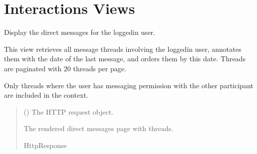 \documentclass[letterpaper,10pt,english]{sphinxmanual}
\begin{document}
\section{Interactions Views}
\label{\detokenize{modules/views:module-interactions.views}}\label{\detokenize{modules/views:interactions-views}}

\begin{fulllineitems}
\label{\detokenize{modules/views:interactions.views.direct_messages}}
\pysigstartsignatures
{}
\pysigstopsignatures
\sphinxAtStartPar
Display the direct messages for the logged\sphinxhyphen{}in user.

\sphinxAtStartPar
This view retrieves all message threads involving the logged\sphinxhyphen{}in user,
annotates them with the date of the last message, and orders them by
this date. Threads are paginated with 20 threads per page.

\sphinxAtStartPar
Only threads where the user has messaging permission with the other
participant are included in the context.
\begin{quote}\begin{description}
\sphinxAtStartPar
{} () \textendash{} The HTTP request object.

\sphinxAtStartPar
The rendered direct messages page with threads.

\sphinxAtStartPar
HttpResponse

\end{description}\end{quote}

\end{fulllineitems}

\end{document}
